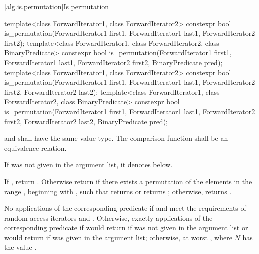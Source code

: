 [alg.is.permutation]{Is permutation}

%
\begin{itemdecl}
template<class ForwardIterator1, class ForwardIterator2>
  constexpr bool is_permutation(ForwardIterator1 first1, ForwardIterator1 last1,
                                ForwardIterator2 first2);
template<class ForwardIterator1, class ForwardIterator2,
         class BinaryPredicate>
  constexpr bool is_permutation(ForwardIterator1 first1, ForwardIterator1 last1,
                                ForwardIterator2 first2, BinaryPredicate pred);
template<class ForwardIterator1, class ForwardIterator2>
  constexpr bool is_permutation(ForwardIterator1 first1, ForwardIterator1 last1,
                                ForwardIterator2 first2, ForwardIterator2 last2);
template<class ForwardIterator1, class ForwardIterator2,
         class BinaryPredicate>
  constexpr bool is_permutation(ForwardIterator1 first1, ForwardIterator1 last1,
                                ForwardIterator2 first2, ForwardIterator2 last2,
                                BinaryPredicate pred);
\end{itemdecl}

\begin{itemdescr}
\pnum
\requires
{} and  shall have
the same value type.
The comparison function shall be an equivalence relation.

\pnum
\remarks
If  was not given in the argument list,
it denotes  below.

\pnum
\returns
If , return .
Otherwise return 
if there exists a permutation of the elements
in the range ,
beginning with ,
such that  returns  or
 returns ;
otherwise, returns .

\pnum
\complexity
No applications of the corresponding predicate
if  and 
meet the requirements of random access iterators and
.
Otherwise, exactly  applications
of the corresponding predicate
if  would return 
if  was not given in the argument list or
 would return 
if  was given in the argument list;
otherwise, at worst , where $N$ has the value .
\end{itemdescr}

